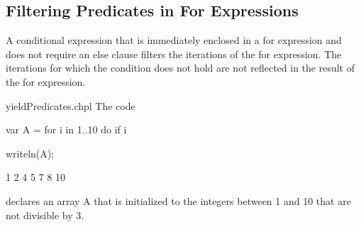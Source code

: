 \subsection{Filtering Predicates in For Expressions}
\label{Filtering_Predicates_For}

A conditional expression that is immediately enclosed in a for
expression and does not require an else clause filters the iterations of the for expression.
The iterations for which the condition does not hold
are not reflected in the result of the for expression.

\begin{chapelexample}{yieldPredicates.chpl}
The code
\begin{chapel}
var A = for i in 1..10 do if i %
\end{chapel}
\begin{chapelpost}
writeln(A);
\end{chapelpost}
\begin{chapeloutput}
1 2 4 5 7 8 10
\end{chapeloutput}
declares an array A that is initialized to the integers between
1 and 10 that are not divisible by 3.
\end{chapelexample}
